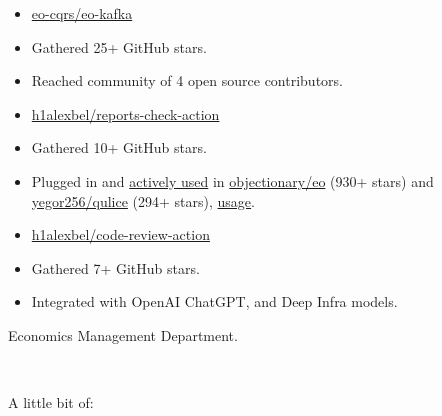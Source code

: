 \documentclass[10pt,a4paper,normalphoto]{altacv}
\begin{document}
\begin{paracol}{2}
    \begin{itemize}
      \item \href{https://github.com/eo-cqrs/eo-kafka}{eo-cqrs/eo-kafka}
      \item Gathered 25+ GitHub stars.
      \item Reached community of 4 open source contributors.
    \end{itemize}
    \divider
    \begin{itemize}
      \item \href{https://github.com/tracehubpm/reports-check-action}{h1alexbel/reports-check-action}
      \item Gathered 10+ GitHub stars.
      \item Plugged in and \href{https://github.com/objectionary/eo/actions/workflows/reports-check.yml}{actively used}
      in \href{https://github.com/objectionary/eo}{objectionary/eo} (930+ stars) and
      \href{https://github.com/yegor256/qulice}{yegor256/qulice} (294+ stars),
      \href{https://github.com/yegor256/qulice/actions/workflows/reports-check.yml}{usage}.
    \end{itemize}
    \divider
    \begin{itemize}
      \item \href{https://github.com/tracehubpm/code-review-action}{h1alexbel/code-review-action}
      \item Gathered 7+ GitHub stars.
      \item Integrated with OpenAI ChatGPT, and Deep Infra models.
    \end{itemize}
    \medskip
    \switchcolumn

    Economics Management Department.

    \\

    \divider\smallskip

    A little bit of:
    \medskip


\end{paracol}
\end{document}
